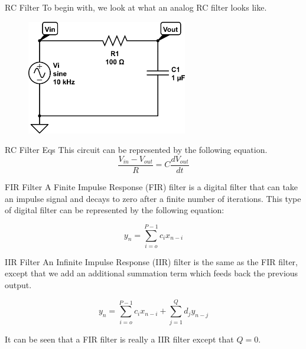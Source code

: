 \documentclass[notes]{beamer}
\begin{document}
\begin{frame}
\begin{block}{RC Filter}
To begin with, we look at what an analog RC filter looks like. 

{\begin{figure}[h!tb] 
\centering
\includegraphics[width=7cm]{../Images/rc-circuit.png}
\label{rc_circuit}
\end{figure}
}
\end{block}
\end{frame}

\begin{frame}
\begin{block}{RC Filter Eqs}
This circuit can be represented by the following equation.
\begin{equation}\label{eq:rc_circuit_eq}
\frac{V_{in}-V_{out}}{R}=C\frac{dV_{out}}{dt}
\end{equation}
\end{block}
\end{frame}

\begin{frame}
\begin{block}{FIR Filter}
A Finite Impulse Response (FIR) filter is a digital filter that can take an impulse signal and decays to zero after a finite number of iterations.  This type of digital filter can be represented by the following equation:

\begin{equation}\label{IIR_yn}
y_n=\displaystyle\sum\limits_{i=o}^{P-1} c_ix_{n-i}
\end{equation}
\end{block}
\end{frame}

\begin{frame}
\begin{block}{IIR Filter}
An Infinite Impulse Response (IIR) filter is the same as the FIR filter, except that we add an additional summation term which feeds back the previous output.

\begin{equation}\label{IIR_sum}
y_n=\displaystyle\sum\limits_{i=o}^{P-1} c_ix_{n-i}+\displaystyle\sum\limits_{j=1}^{Q} d_jy_{n-j}
\end{equation}

It can be seen that a FIR filter is really a IIR filter except that $Q=0$.  
\end{block}
\end{frame}
\end{document}

